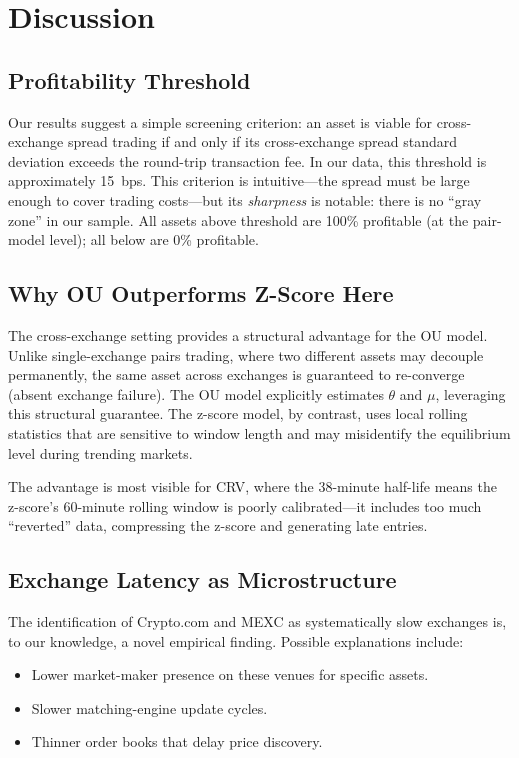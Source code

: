 \documentclass[sigconf,nonacm=false]{acmart}
\begin{document}
\section{Discussion}\label{sec:discussion}

\subsection{Profitability Threshold}

Our results suggest a simple screening criterion: an asset is viable for cross-exchange spread trading if and only if its cross-exchange spread standard deviation exceeds the round-trip transaction fee. In our data, this threshold is approximately 15~bps. This criterion is intuitive---the spread must be large enough to cover trading costs---but its \emph{sharpness} is notable: there is no ``gray zone'' in our sample. All assets above threshold are 100\% profitable (at the pair-model level); all below are 0\% profitable.

\subsection{Why OU Outperforms Z-Score Here}

The cross-exchange setting provides a structural advantage for the OU model. Unlike single-exchange pairs trading, where two different assets may decouple permanently, the same asset across exchanges is guaranteed to re-converge (absent exchange failure). The OU model explicitly estimates $\theta$ and $\mu$, leveraging this structural guarantee. The z-score model, by contrast, uses local rolling statistics that are sensitive to window length and may misidentify the equilibrium level during trending markets.

The advantage is most visible for CRV, where the 38-minute half-life means the z-score's 60-minute rolling window is poorly calibrated---it includes too much ``reverted'' data, compressing the z-score and generating late entries.

\subsection{Exchange Latency as Microstructure}

The identification of Crypto.com and MEXC as systematically slow exchanges is, to our knowledge, a novel empirical finding. Possible explanations include:
\begin{itemize}
    \item Lower market-maker presence on these venues for specific assets.
    \item Slower matching-engine update cycles.
    \item Thinner order books that delay price discovery.
\end{itemize}
\end{document}
